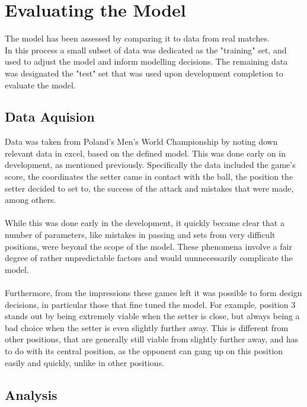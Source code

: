 \documentclass[main.tex]{subfiles}
\begin{document}
  \section{Evaluating the Model}
      
      The model has been assessed by comparing it to data from real matches. \\
      In this process a small subset of data was dedicated as the "training" set, and used to adjust the model and inform modelling decisions. The remaining data was designated the "test" set that was used upon development completion to evaluate the model.
      
      \subsection{Data Aquision}
        
        Data was taken from Poland's Men's World Championship \cite{dataGames} by noting down relevant data in excel, based on the defined model. This was done early on in development, as mentioned previously. Specifically the data included the game's score, the coordinates the setter came in contact with the ball, the position the setter decided to set to, the success of the attack and mistakes that were made, among others.
        \\\\
        While this was done early in the development, it quickly became clear that a number of parameters, like mistakes in passing and sets from very difficult positions, were beyond the scope of the model. These phenomena involve a fair degree of rather unpredictable factors and would uunnecessarily complicate the model.
        \\\\
        Furthermore, from the impressions these games left it was possible to form design decisions, in particular those that fine tuned the model. For example, position 3 stands out by being extremely viable when the setter is close, but always being a bad choice when the setter is even slightly further away. This is different from other positions, that are generally still viable from slightly further away, and has to do with its central position, as the opponent can gang up on this position easily and quickly, unlike in other positions.\\
        
      \subsection{Analysis}
        
\end{document}
